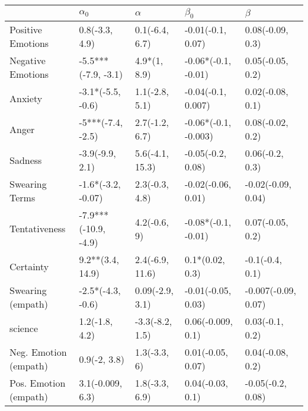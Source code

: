 \begin{tabular}{lllll}
\toprule
{} &            $\alpha_0$ &         $\alpha$ &             $\beta_0$ &              $\beta$ \\
\midrule
Positive Emotions     &        0.8(-3.3, 4.9) &   0.1(-6.4, 6.7) &     -0.01(-0.1, 0.07) &     0.08(-0.09, 0.3) \\
Negative Emotions     &   -5.5***(-7.9, -3.1) &     4.9*(1, 8.9) &   -0.06*(-0.1, -0.01) &     0.05(-0.05, 0.2) \\
Anxiety               &     -3.1*(-5.5, -0.6) &   1.1(-2.8, 5.1) &    -0.04(-0.1, 0.007) &     0.02(-0.08, 0.1) \\
Anger                 &     -5***(-7.4, -2.5) &   2.7(-1.2, 6.7) &  -0.06*(-0.1, -0.003) &     0.08(-0.02, 0.2) \\
Sadness               &       -3.9(-9.9, 2.1) &  5.6(-4.1, 15.3) &     -0.05(-0.2, 0.08) &      0.06(-0.2, 0.3) \\
Swearing Terms        &    -1.6*(-3.2, -0.07) &   2.3(-0.3, 4.8) &    -0.02(-0.06, 0.01) &   -0.02(-0.09, 0.04) \\
Tentativeness         &  -7.9***(-10.9, -4.9) &     4.2(-0.6, 9) &   -0.08*(-0.1, -0.01) &     0.07(-0.05, 0.2) \\
Certainty             &      9.2**(3.4, 14.9) &  2.4(-6.9, 11.6) &       0.1*(0.02, 0.3) &      -0.1(-0.4, 0.1) \\
Swearing (empath)     &     -2.5*(-4.3, -0.6) &  0.09(-2.9, 3.1) &    -0.01(-0.05, 0.03) &  -0.007(-0.09, 0.07) \\
science               &        1.2(-1.8, 4.2) &  -3.3(-8.2, 1.5) &     0.06(-0.009, 0.1) &      0.03(-0.1, 0.2) \\
Neg. Emotion (empath) &          0.9(-2, 3.8) &     1.3(-3.3, 6) &     0.01(-0.05, 0.07) &     0.04(-0.08, 0.2) \\
Pos. Emotion (empath) &      3.1(-0.009, 6.3) &   1.8(-3.3, 6.9) &      0.04(-0.03, 0.1) &    -0.05(-0.2, 0.08) \\
\bottomrule
\end{tabular}
